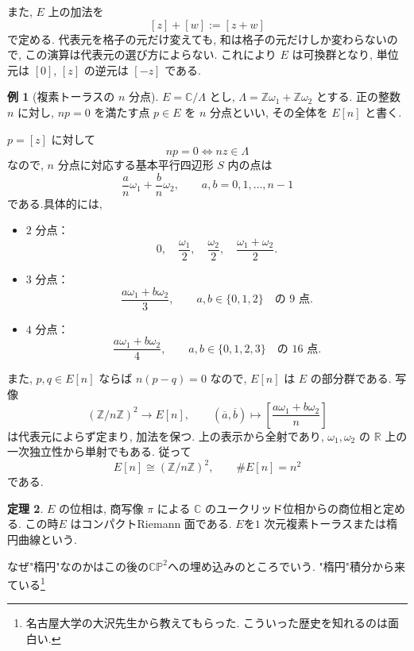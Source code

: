 \documentclass[dvipdfmx,a4paper,11pt]{article} %
\newcommand{\R}{\mathbb{R}}
\newcommand{\Z}{\mathbb{Z}}
\newcommand{\C}{\mathbb{C}}
\theoremstyle{definition}
\newtheorem{thm}{定理}[section]
\numberwithin{equation}{section}
\newtheorem{exa}[thm]{例}
\begin{document}
また, $E$ 上の加法を
\[
[z]+[w]:=[z+w]
\]
で定める.
代表元を格子の元だけ変えても, 和は格子の元だけしか変わらないので, 
この演算は代表元の選び方によらない.
これにより $E$ は可換群となり, 単位元は $[0]$, 
$[z]$ の逆元は $[-z]$ である.




\begin{exa}[複素トーラスの $n$ 分点]\label{O-M131}
$E=\C/\Lambda$ とし, $\Lambda=\Z\omega_1+\Z\omega_2$ とする.
正の整数 $n$ に対し, $np=0$ を満たす点 $p\in E$ を
$n$ 分点といい, その全体を $E[n]$ と書く.

$p=[z]$ に対して
\[
np=0\iff nz\in\Lambda
\]
なので, $n$ 分点に対応する基本平行四辺形 $S$ 内の点は
\[
\frac{a}{n}\omega_1+\frac{b}{n}\omega_2,
\qquad a,b=0,1,\ldots,n-1
\]
である.具体的には, 
\begin{itemize}
\item $2$ 分点：
\[
0,\quad \frac{\omega_1}{2},\quad
\frac{\omega_2}{2},\quad \frac{\omega_1+\omega_2}{2}.
\]
\item $3$ 分点：
\[
\frac{a\omega_1+b\omega_2}{3},
\qquad a,b\in\{0,1,2\}
\quad\text{の $9$ 点}.
\]
\item $4$ 分点：
\[
\frac{a\omega_1+b\omega_2}{4},
\qquad a,b\in\{0,1,2,3\}
\quad\text{の $16$ 点}.
\]
\end{itemize}

また, $p,q\in E[n]$ ならば $n(p-q)=0$ なので, 
$E[n]$ は $E$ の部分群である.
写像
\[
(\Z/n\Z)^2\longrightarrow E[n],\qquad
(\overline a,\overline b)\longmapsto
\left[\frac{a\omega_1+b\omega_2}{n}\right]
\]
は代表元によらず定まり, 加法を保つ.
上の表示から全射であり, 
$\omega_1,\omega_2$ の $\R$ 上の一次独立性から単射でもある.
従って
\[
E[n]\cong(\Z/n\Z)^2,\qquad \#E[n]=n^2
\]
である.
\end{exa}

\begin{thm}
$E$ の位相は, 商写像 $\pi$ による $\C{}$ のユークリッド位相からの商位相と定める. 
この時$E$ はコンパクトRiemann 面である.
$E$を$1$ 次元複素トーラスまたは楕円曲線という.
\end{thm}
なぜ"楕円"なのかはこの後の$\C\mathbb P^2$への埋め込みのところでいう. 
"楕円"積分から来ている\footnote{名古屋大学の大沢先生から教えてもらった. こういった歴史を知れるのは面白い.}
\end{document}
